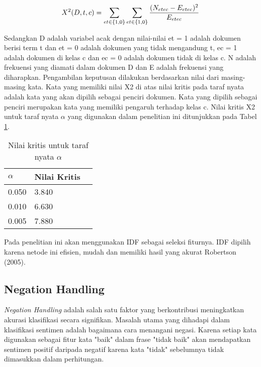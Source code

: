 \begin{equation}
\begin{split}
\tiny
X^2(D, t, c) = \sum\limits_{et\in\{1,0\}}\sum\limits_{et\in\{1,0\}} \frac{(N_{etec} - E_{etec})^2}{E_{etec}}
\label{eq:chi}
\normalsize
\end{split}
\end{equation}

Sedangkan D adalah variabel acak dengan nilai-nilai et = 1 adalah dokumen berisi term t dan et = 0 adalah dokumen yang tidak mengandung t, ec = 1 adalah dokumen di kelas c dan ec = 0 adalah dokumen tidak di kelas c. N adalah frekuensi yang diamati dalam dokumen D dan E adalah frekuensi yang diharapkan. Pengambilan keputusan dilakukan berdasarkan nilai dari masing-masing kata. Kata yang memiliki nilai X2 di atas nilai kritis pada taraf nyata adalah kata yang akan dipilih sebagai penciri dokumen. Kata yang dipilih sebagai penciri merupakan kata yang memiliki pengaruh terhadap kelas c. Nilai kritis  X2  untuk taraf nyata $\alpha$ yang digunakan dalam penelitian ini ditunjukkan pada Tabel  \ref{tab:chisquare}.

\begin{table}[hbt]
	\caption{Nilai kritis untuk taraf nyata $\alpha$}
	\centering
	\begin{tabular}{llr}
		\toprule
		$\alpha$ & Nilai Kritis \\
		\midrule
		0.050 & 3.840 \\
		0.010 & 6.630 \\
		0.005 & 7.880 \\
		\bottomrule
	\end{tabular}
	\label{tab:chisquare}
\end{table}

Pada penelitian ini akan menggunakan IDF sebagai seleksi fiturnya. IDF dipilih karena netode ini efisien, mudah dan memiliki hasil yang akurat Robertson (2005).

\subsection*{Negation Handling}

\textit{Negation Handling} adalah salah satu faktor yang berkontribusi meningkatkan akurasi klasifikasi secara signifikan. Masalah utama yang dihadapi dalam klasifikasi sentimen adalah bagaimana cara menangani negasi. Karena setiap kata digunakan sebagai fitur kata "baik" dalam frase "tidak baik" akan mendapatkan sentimen positif daripada negatif karena kata "tidak" sebelumnya tidak dimasukkan dalam perhitungan.

